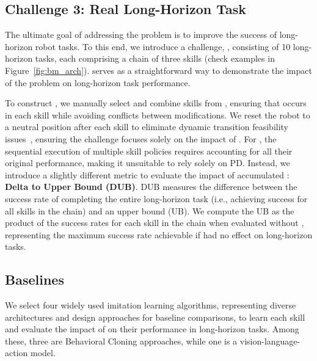 \subsection{Challenge 3: Real Long-Horizon Task}
\label{subsec:bm_3}
The ultimate goal of addressing the \pb problem is to improve the success of long-horizon robot tasks. To this end, we introduce a challenge, \bmc, consisting of 10 long-horizon tasks, each comprising a chain of three skills (check examples in Figure~\ref{fig:bm_arch}). \bmc serves as a straightforward way to demonstrate the impact of the \pb problem on long-horizon task performance.

To construct \bmc, we manually select and combine skills from \taskoriginal {}, ensuring that \pb occurs in each skill while avoiding conflicts between modifications. We reset the robot to a neutral position after each skill to eliminate dynamic transition feasibility issues~\cite{chen2023sequential}, ensuring the challenge focuses solely on the impact of \pb{}. For \bmc, the sequential execution of multiple skill policies requires accounting for all their original performance, making it unsuitable to rely solely on PD. Instead, we introduce a slightly different metric to evaluate the impact of accumulated \pb: \textbf{Delta to Upper Bound (DUB)}. DUB measures the difference between the success rate of completing the entire long-horizon task (i.e., achieving success for all skills in the chain) and an upper bound (UB). We compute the UB as the product of the success rates for each skill in the chain when evaluated without \pb, representing the maximum success rate achievable if \pb had no effect on long-horizon tasks. 




\subsection{Baselines}
\label{subsec:basic_bl}

We select four widely used imitation learning algorithms, representing diverse architectures and design approaches for baseline comparisons, to learn each skill and evaluate the impact of \pb on their performance in long-horizon tasks.  Among these, three are Behavioral Cloning approaches, while one is a vision-language-action model.


